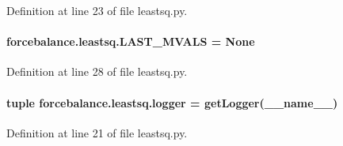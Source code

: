 Definition at line 23 of file leastsq.\-py.

\hypertarget{namespaceforcebalance_1_1leastsq_a037a62063d126288c2df0f4e0cd5085a}{
\paragraph[{L\-A\-S\-T\-\_\-\-M\-V\-A\-L\-S}]{\setlength{\rightskip}{0pt plus 5cm}forcebalance.\-leastsq.\-L\-A\-S\-T\-\_\-\-M\-V\-A\-L\-S = None}}\label{namespaceforcebalance_1_1leastsq_a037a62063d126288c2df0f4e0cd5085a}


Definition at line 28 of file leastsq.\-py.

\hypertarget{namespaceforcebalance_1_1leastsq_ab5873c70f3da934d9c5c78ca9c7ca8d0}{
\paragraph[{logger}]{\setlength{\rightskip}{0pt plus 5cm}tuple forcebalance.\-leastsq.\-logger = get\-Logger(\-\_\-\-\_\-name\-\_\-\-\_\-)}}\label{namespaceforcebalance_1_1leastsq_ab5873c70f3da934d9c5c78ca9c7ca8d0}


Definition at line 21 of file leastsq.\-py.

